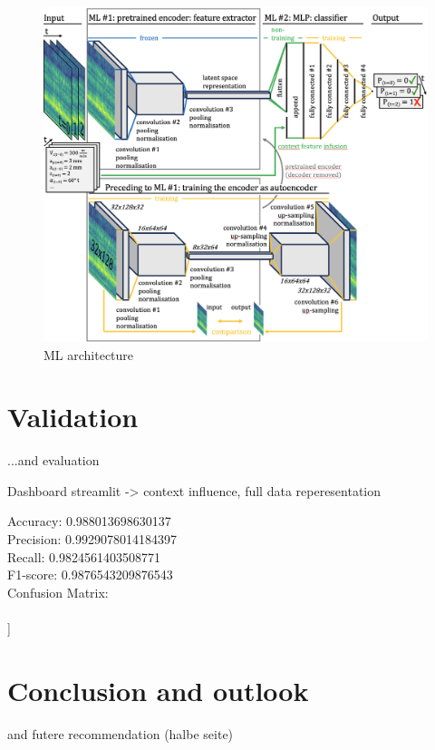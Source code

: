 \documentclass[5p,times,procedia]{elsarticle}
\newenvironment{note}{%
	\noindent
    \color{notecolor}%
}{%
    \par\medskip%
}
\begin{document}
\begin{figure}[t]
    \centering
    \includegraphics[width=0.99\linewidth]{ML_architecture.png}
    \caption{ML architecture}
    \label{ML_architecture}
\end{figure}



 
\section{Validation}
\begin{note}
	...and evaluation
	
	Dashboard streamlit -> context influence, full data reperesentation

\end{note}


Accuracy: 0.988013698630137\\
Precision: 0.9929078014184397\\
Recall: 0.9824561403508771\\
F1-score: 0.9876543209876543\\
Confusion Matrix:\\
[[297   2]\\
 [  5 280]]\\
 
 
 
\section{Conclusion and outlook}
\begin{note}
	and futere recommendation (halbe seite)
	
\end{note}
\end{document}
